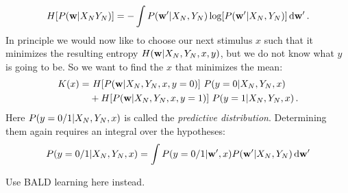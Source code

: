 \begin{align}
	H[{P({\bf w} | X_N Y_N)}] = - \int {P({\bf w}' | X_N, Y_N)} \log[{P({\bf w}' | X_N, Y_N)}] \,\mathrm{d} {\bf w}' \,.
\end{align}
In principle we would now like to choose our next stimulus $x$ such that it minimizes the resulting entropy $H({\bf w} | X_N, Y_N, x, y)$, but we do not know what $y$ is going to be. So we want to find the $x$ that minimizes the mean:
\begin{align}
	K(x) =&~ H[{P({\bf w} | X_N, Y_N, x, y = 0)}] ~
	{P(y = 0 | X_N, Y_N, x)} \\
	&+
	H[{P({\bf w} | X_N, Y_N, x, y = 1)}] ~
	{P(y = 1 | X_N, Y_N, x)} \,.
\end{align}
Here ${P(y = 0/1 | X_N, Y_N, x)}$ is called the \emph{predictive distribution}. Determining them again requires an integral over the hypotheses:
\begin{align}
	{P(y = 0/1 | X_N, Y_N, x)}
	= \int {P(y = 0/1 | {\bf w}', x)} {P({\bf w}' | X_N, Y_N)} \,\mathrm{d} {\bf w}'
\end{align}

Use BALD learning here instead.



